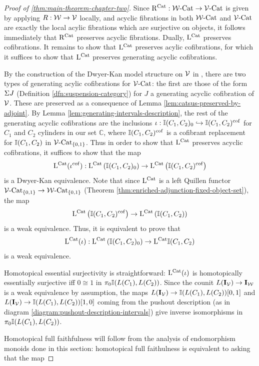 \documentclass[12pt]{amsart}
\newcommand{\cof}{\mathrm{cof}}
\begin{document}
\begin{proof}[Proof of \ref{thm:main-theorem-chapter-two}]
	Since $\mathrm{R}^{\mathrm{Cat}}: \mathcal{W}\text{-}\mathrm{Cat} \to \mathcal{V}\text{-}\mathrm{Cat}$ is given by applying $R: \mathcal{W} \to \mathcal{V}$ locally, and acyclic fibrations in both $\mathcal{W}\text{-}\mathrm{Cat}$ and $\mathcal{V}\text{-}\mathrm{Cat}$ are exactly the local acylic fibrations which are surjective on objects, it follows immediately that $\mathrm{R}^{\mathrm{Cat}}$ preserves acyclic fibrations. 
	Dually, $\mathrm{L}^{\mathrm{Cat}}$ preserves cofibrations. It remains to show that $\mathrm{L}^{\mathrm{Cat}}$ preserves acylic cofibrations, for which it suffices to show that $\mathrm{L}^{\mathrm{Cat}}$ preserves generating acyclic cofibrations.
	\par 
	By the construction of the Dwyer-Kan model structure on $\mathcal{V}$ in \cite{Muro2012}, there are two types of generating acylic cofibrations for $\mathcal{V}\text{-}\mathrm{Cat}$: the first are those of the form $\Sigma J$ (Definition \ref{dfn:suspension-category}) for $J$ a generating acyclic cofibration of $\mathcal{V}$. 
	These are preserved as a consequence of Lemma \ref{lem:catsus-preserved-by-adjoint}. 
	By Lemma \ref{lem:generating-intervals-description}, the rest of the generating acyclic cofibrations are the inclusions $\iota: \I(C_1,C_2)_0 \hookrightarrow \I(C_1,C_2)^{\cof}$ for $C_1$ and $C_2$ cylinders in our set $\mathbb{C}$, where $\I(C_1,C_2)^\cof$ is a cofibrant replacement for $\mathbb{I}(C_1,C_2)$ in $\mathcal{V}\text{-}\mathrm{Cat}_{\{0,1\}}$.
	Thus in order to show that $\mathrm{L}^{\mathrm{Cat}}$ preserves acyclic cofibrations, it suffices to show that the map
	$$\lcat(\iota^\cof): \lcat \left(\I(C_1,C_2)_0\right) \to \lcat\left(\I(C_1,C_2)^\cof \right)$$
	is a Dwyer-Kan equivalence. 
	Note that since $\mathrm{L}^{\mathrm{Cat}}$ is a left Quillen functor $\mathcal{V}\text{-}\mathrm{Cat}_{\{0,1\}} \to \mathcal{W}\text{-}\mathrm{Cat}_{\{0,1\}}$ (Theorem \ref{thm:enriched-adjunction-fixed-object-set}), the map 
	$$\lcat\left(\I(C_1,C_2)^\cof \right) \to \lcat\left(\I(C_1,C_2) \right)$$
	is a weak equivalence. 
	Thus, it is equivalent to prove that
	$$\mathrm{L}^{\mathrm{Cat}}(\iota): \mathrm{L}^{\mathrm{Cat}} \left(\mathbb{I}(C_1,C_2)_0\right) \to \mathrm{L}^{\mathrm{Cat}}\mathbb{I}(C_1,C_2) $$ 
	is a weak equivalence. 
	\par 
	Homotopical essential surjectivity is straightforward: 
	$\mathrm{L}^{\mathrm{Cat}}(\iota)$ is homotopically essentially surjective iff $0 \cong 1$ in $\pi_0 \mathbb{I}(L(C_1), L(C_2))$.
	Since the counit $L(\mathbf{I}_\mathcal{V}) \to \mathbf{I}_\mathcal{W}$ is a weak equivalence by assumption, the maps $L(\mathbf{I}_\mathcal{V}) \to \mathbb{I}(L(C_1), L(C_2))[0,1]$ and $L(\mathbf{I}_\mathcal{V}) \to \mathbb{I}(L(C_1), L(C_2))[1,0]$ coming from the pushout description (as in diagram \eqref{diagram:pushout-description-intervals}) give inverse isomorphisms in $\pi_0 \mathbb{I}(L(C_1), L(C_2))$.
	\par 
	Homotopical full faithfulness will follow from the analysis of endomorphism monoids done in this section:
	homotopical full faithulness is equivalent to asking that the map

\end{proof}
\end{document}
